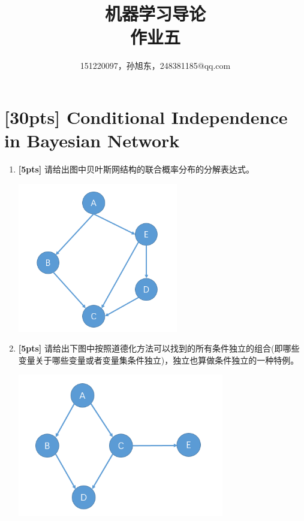 \documentclass[a4paper,UTF8]{article}
\numberwithin{equation}{section}
\begin{document}
\title{机器学习导论\\
作业五}
\author{151220097，孙旭东，248381185@qq.com}
\maketitle
\section{[30pts] Conditional Independence in Bayesian Network}
\begin{enumerate}[(1)]
\item \textbf{[5pts]} 请给出图中贝叶斯网结构的联合概率分布的分解表达式。

\label{structure1}
\includegraphics[width=7cm]{structure1.png}
\item \textbf{[5pts]} 请给出下图中按照道德化方法可以找到的所有条件独立的组合(即哪些变量关于哪些变量或者变量集条件独立)，独立也算做条件独立的一种特例。

\includegraphics[width=9cm]{structure2.png}



\end{enumerate}
\end{document}
